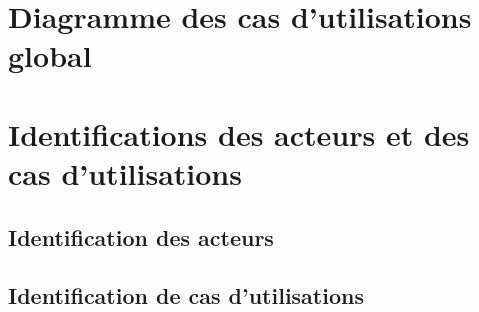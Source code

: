  \section{Diagramme des cas d'utilisations global}
 
 
 \section{Identifications des acteurs et des cas d'utilisations}
 
 \subsection{Identification des acteurs}
 
 \subsection{Identification de cas d'utilisations}
 